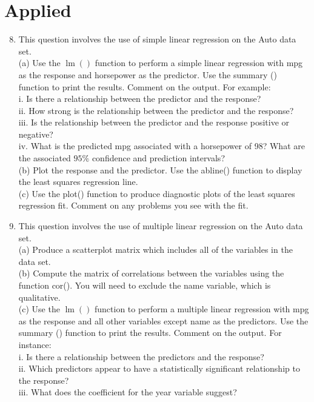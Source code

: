 \documentclass[10pt]{article}
\begin{document}
\section*{Applied}
\begin{enumerate}
  \setcounter{enumi}{7}
  \item This question involves the use of simple linear regression on the Auto data set.\\
(a) Use the $\operatorname{lm}()$ function to perform a simple linear regression with mpg as the response and horsepower as the predictor. Use the summary () function to print the results. Comment on the output. For example:\\
i. Is there a relationship between the predictor and the response?\\
ii. How strong is the relationship between the predictor and the response?\\
iii. Is the relationship between the predictor and the response positive or negative?\\
iv. What is the predicted mpg associated with a horsepower of 98? What are the associated $95 \%$ confidence and prediction intervals?\\
(b) Plot the response and the predictor. Use the abline() function to display the least squares regression line.\\
(c) Use the plot() function to produce diagnostic plots of the least squares regression fit. Comment on any problems you see with the fit.
  \item This question involves the use of multiple linear regression on the Auto data set.\\
(a) Produce a scatterplot matrix which includes all of the variables in the data set.\\
(b) Compute the matrix of correlations between the variables using the function cor(). You will need to exclude the name variable, which is qualitative.\\
(c) Use the $\operatorname{lm}()$ function to perform a multiple linear regression with mpg as the response and all other variables except name as the predictors. Use the summary () function to print the results. Comment on the output. For instance:\\
i. Is there a relationship between the predictors and the response?\\
ii. Which predictors appear to have a statistically significant relationship to the response?\\
iii. What does the coefficient for the year variable suggest?\\

\end{enumerate}
\end{document}
